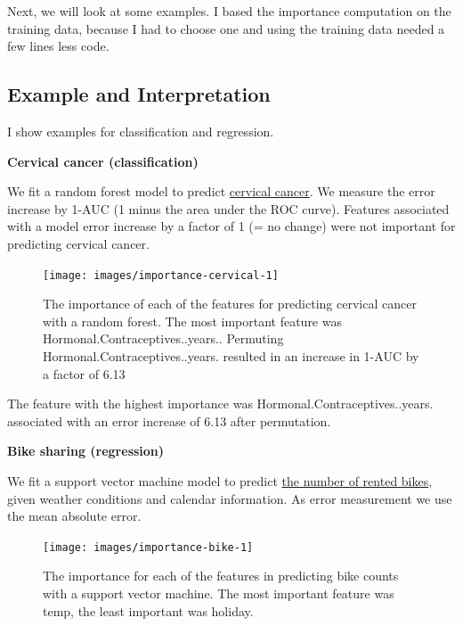 \documentclass[
  12pt,
]{krantz}
\begin{document}
Next, we will look at some examples.
I based the importance computation on the training data, because I had to choose one and using the training data needed a few lines less code.

\hypertarget{example-and-interpretation}{%
\subsection{Example and Interpretation}\label{example-and-interpretation}}

I show examples for classification and regression.

\textbf{Cervical cancer (classification)}

We fit a random forest model to predict \protect\hyperlink{cervical}{cervical cancer}.
We measure the error increase by 1-AUC (1 minus the area under the ROC curve).
Features associated with a model error increase by a factor of 1 (= no change) were not important for predicting cervical cancer.

\begin{figure}

{\centering \texttt{[image: images/importance-cervical-1]} 

}

\caption{The importance of each of the features for predicting cervical cancer with a random forest. The most important feature was Hormonal.Contraceptives..years.. Permuting Hormonal.Contraceptives..years. resulted in an increase in 1-AUC by a factor of 6.13}\label{fig:importance-cervical}
\end{figure}

The feature with the highest importance was Hormonal.Contraceptives..years. associated with an error increase of 6.13 after permutation.

\textbf{Bike sharing (regression)}

We fit a support vector machine model to predict \protect\hyperlink{bike-data}{the number of rented bikes}, given weather conditions and calendar information.
As error measurement we use the mean absolute error.

\begin{figure}

{\centering \texttt{[image: images/importance-bike-1]} 

}

\caption{The importance for each of the features in predicting bike counts with a support vector machine. The most important feature was temp, the least important was holiday.}\label{fig:importance-bike}
\end{figure}
\end{document}
